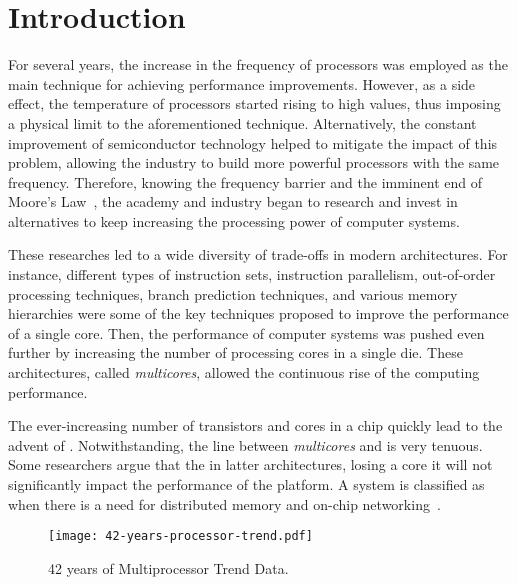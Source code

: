 \chapter{Introduction}
\label{ch.intro}

	For several years, the increase in the frequency of processors was
	employed as the main technique for achieving performance
	improvements. However, as a side effect, the temperature of
	processors started rising to high values, thus imposing a physical
	limit to the aforementioned technique.  Alternatively, the constant
	improvement of semiconductor technology helped to mitigate the
	impact of this problem, allowing the industry to build more powerful
	processors with the same frequency.  Therefore, knowing the
	frequency barrier and the imminent end of Moore's
	Law~\cite{moore:1965}, the academy and industry began to research
	and invest in alternatives to keep increasing the processing power
	of computer systems.

	These researches led to a wide diversity of trade-offs in modern
	architectures.  For instance, different types of instruction sets,
	instruction parallelism, out-of-order processing techniques, branch
	prediction techniques, and various memory hierarchies were some of
	the key techniques proposed to improve the performance of a single
	core.  Then, the performance of computer systems was pushed even
	further by increasing the number of processing cores in a single
	die. These architectures, called \textit{multicores}, allowed the
	continuous rise of the computing performance.


	The ever-increasing number of transistors and cores in a chip
	quickly lead to the advent of \manycores.  Notwithstanding, the line
	between \textit{multicores} and \manycores is very tenuous.  Some
	researchers argue that the in latter architectures, losing a core it
	will not significantly impact the performance of the platform.  A
	system is classified as \manycore when there is a need for
	distributed memory and on-chip networking~\cite{freitas:thesis}.

	\begin{figure}[t]
		\centering%
		\caption{42 years of Multiprocessor Trend Data.}%
		\label{fig:microprocessor-data}%
		\texttt{[image: 42-years-processor-trend.pdf]}%
	\end{figure}

